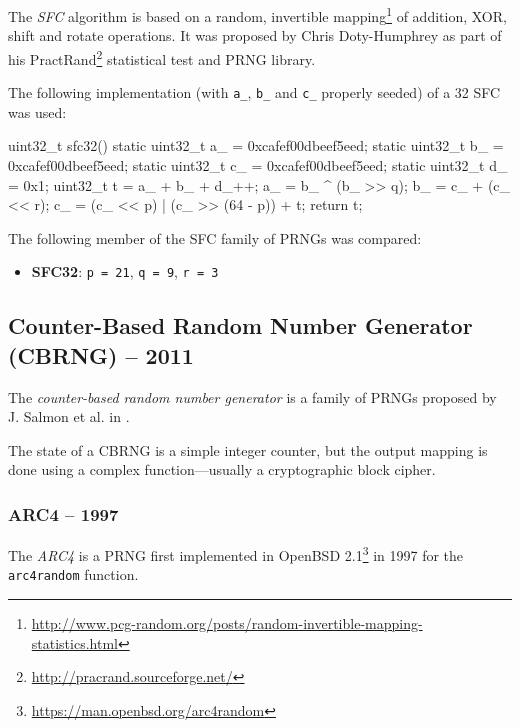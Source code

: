     The \emph{SFC} algorithm is based on a random, invertible mapping\footnote{\url{http://www.pcg-random.org/posts/random-invertible-mapping-statistics.html}} of addition, XOR, shift and rotate operations. It was proposed by Chris Doty-Humphrey as part of his PractRand\footnote{\url{http://pracrand.sourceforge.net/}} statistical test and PRNG library.

    The following implementation (with \lstinline|a_|, \lstinline|b_| and \lstinline|c_| properly seeded) of a \SI{32}{\bit} SFC was used:
\begin{@empty}
    \lstset{
        language = [ISO]C++
    }
\begin{centeredshadowboxlisting}
uint32_t sfc32() {
    static uint32_t a_ = 0xcafef00dbeef5eed;
    static uint32_t b_ = 0xcafef00dbeef5eed;
    static uint32_t c_ = 0xcafef00dbeef5eed;
    static uint32_t d_ = 0x1;
    uint32_t t = a_ + b_ + d_++;
    a_ = b_ ^ (b_ >> q);
    b_ = c_ + (c_ << r);
    c_ = (c_ << p) | (c_ >> (64 - p)) + t;
    return t;
}
\end{centeredshadowboxlisting}
\end{@empty}

    The following member of the SFC family of PRNGs was compared:
    \begin{itemize}
        \itemsep0em
        \item \textbf{SFC32}: \lstinline|p = 21|, \lstinline|q = 9|, \lstinline|r = 3|
    \end{itemize}

\subsection[Counter-Based Random Number Generator (CBRNG) -- 2011]{Counter-Based Random Number Generator (CBRNG) -- 2011} \label{subsec:cbrng}

    The \emph{counter-based random number generator} is a family of PRNGs proposed by J. Salmon et al. in \cite{Salmon:2011}.

    The state of a CBRNG is a simple integer counter, but the output mapping is done using a complex function---usually a cryptographic block cipher.

\subsubsection[ARC4 -- 1997]{ARC4 -- 1997} \label{subsubsec:arc4}

    The \emph{ARC4} is a PRNG first implemented in OpenBSD 2.1\footnote{\url{https://man.openbsd.org/arc4random}} in 1997 for the \lstinline|arc4random| function.

